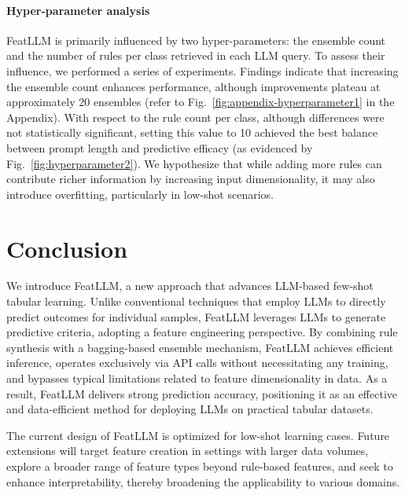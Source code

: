 \vspace*{-0.12in}
\paragraph{Hyper-parameter analysis}
\textsf{FeatLLM} is primarily influenced by two hyper-parameters: the ensemble count and the number of rules per class retrieved in each LLM query. To assess their influence, we performed a series of experiments. Findings indicate that increasing the ensemble count enhances performance, although improvements plateau at approximately 20 ensembles (refer to Fig.~\ref{fig:appendix-hyperparameter1} in the Appendix). With respect to the rule count per class, although differences were not statistically significant, setting this value to 10 achieved the best balance between prompt length and predictive efficacy (as evidenced by Fig.~\ref{fig:hyperparameter2}). We hypothesize that while adding more rules can contribute richer information by increasing input dimensionality, it may also introduce overfitting, particularly in low-shot scenarios.

\section{Conclusion}
We introduce \textsf{FeatLLM}, a new approach that advances LLM-based few-shot tabular learning. Unlike conventional techniques that employ LLMs to directly predict outcomes for individual samples, \textsf{FeatLLM} leverages LLMs to generate predictive criteria, adopting a feature engineering perspective. By combining rule synthesis with a bagging-based ensemble mechanism, \textsf{FeatLLM} achieves efficient inference, operates exclusively via API calls without necessitating any training, and bypasses typical limitations related to feature dimensionality in data. As a result, \textsf{FeatLLM} delivers strong prediction accuracy, positioning it as an effective and data-efficient method for deploying LLMs on practical tabular datasets.

The current design of \textsf{FeatLLM} is optimized for low-shot learning cases. Future extensions will target feature creation in settings with larger data volumes, explore a broader range of feature types beyond rule-based features, and seek to enhance interpretability, thereby broadening the applicability to various domains.

